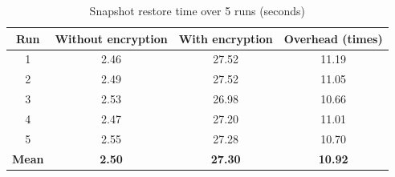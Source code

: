 \begin{table}[H]
\centering
\caption{Snapshot restore time over 5 runs (seconds)}
\label{tab:restore_runs}
\begin{tabular}{|c|c|c|c|}
\toprule
\textbf{Run} & \textbf{Without encryption} & \textbf{With encryption} & \textbf{Overhead (times)} \\
\midrule
1 & 2.46 & 27.52 & 11.19 \\
2 & 2.49 & 27.52 & 11.05 \\
3 & 2.53 & 26.98 & 10.66 \\
4 & 2.47 & 27.20 & 11.01 \\
5 & 2.55 & 27.28 & 10.70 \\
\midrule
\textbf{Mean} & \textbf{2.50} & \textbf{27.30} & \textbf{10.92} \\
\bottomrule
\end{tabular}
\end{table}
